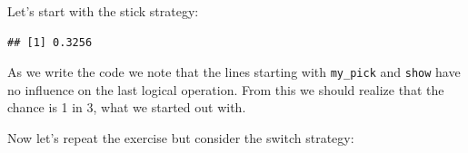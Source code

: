 \documentclass[
  openany]{book}
\newenvironment{Shaded}{\begin{snugshade}}{\end{snugshade}}
\newcommand{\DecValTok}[1]{\textcolor[rgb]{0.00,0.00,0.81}{#1}}
\newcommand{\KeywordTok}[1]{\textcolor[rgb]{0.13,0.29,0.53}{\textbf{#1}}}
\newcommand{\NormalTok}[1]{#1}
\newcommand{\OperatorTok}[1]{\textcolor[rgb]{0.81,0.36,0.00}{\textbf{#1}}}
\newcommand{\StringTok}[1]{\textcolor[rgb]{0.31,0.60,0.02}{#1}}
\begin{document}
Let's start with the stick strategy:

\begin{Shaded}
\end{Shaded}

\begin{verbatim}
## [1] 0.3256
\end{verbatim}

As we write the code we note that the lines starting with \texttt{my\_pick} and \texttt{show} have no influence on the last logical operation. From this we should realize that the chance is 1 in 3, what we started out with.

Now let's repeat the exercise but consider the switch strategy:
\end{document}
